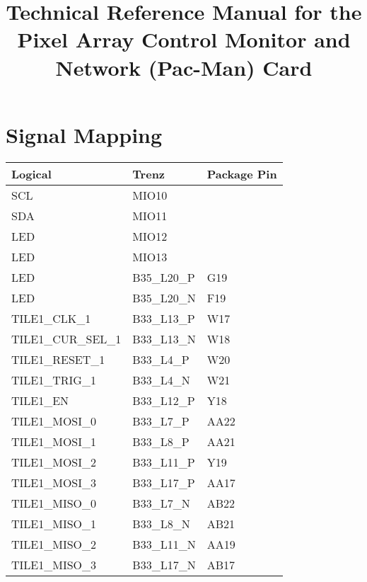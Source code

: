\documentclass[12pt]{article}
\begin{document}

\title{Technical Reference Manual for the Pixel Array Control Monitor and Network (Pac-Man) Card}

\maketitle

\section{Signal Mapping}

\begin{tabular}{lll}
\hline
Logical & Trenz & Package Pin \\  
\hline
SCL         & MIO10        & \\
SDA         & MIO11        & \\
LED         & MIO12        & \\
LED         & MIO13        & \\
LED         & B35\_L20\_P  & G19 \\
LED         & B35\_L20\_N  & F19 \\
\hline
TILE1\_CLK\_1      & B33\_L13\_P  & W17\\
TILE1\_CUR\_SEL\_1 & B33\_L13\_N  & W18\\
TILE1\_RESET\_1    & B33\_L4\_P   & W20\\
TILE1\_TRIG\_1     & B33\_L4\_N   & W21\\
TILE1\_EN          & B33\_L12\_P  & Y18\\
TILE1\_MOSI\_0     & B33\_L7\_P   & AA22\\
TILE1\_MOSI\_1     & B33\_L8\_P   & AA21\\
TILE1\_MOSI\_2     & B33\_L11\_P  & Y19\\
TILE1\_MOSI\_3     & B33\_L17\_P  & AA17\\
TILE1\_MISO\_0     & B33\_L7\_N   & AB22\\
TILE1\_MISO\_1     & B33\_L8\_N   & AB21\\
TILE1\_MISO\_2     & B33\_L11\_N  & AA19\\
TILE1\_MISO\_3     & B33\_L17\_N  & AB17\\
\hline
\end{tabular}
\end{document}
